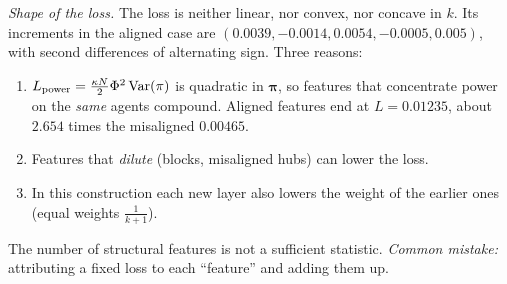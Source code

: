 \documentclass[../solutions_manual.tex]{subfiles}
\begin{document}
\emph{Shape of the loss.} The loss is neither linear, nor convex, nor concave in $k$. Its increments in the aligned case are $(0.0039, -0.0014, 0.0054, -0.0005, 0.005)$, with second differences of alternating sign. Three reasons:
\begin{enumerate}
\item $L_{\text{power}} = \frac{\kappa N}{2}\Phi^2\operatorname{Var}(\pi)$ is quadratic in $\boldsymbol\pi$, so features that concentrate power on the \emph{same} agents compound. Aligned features end at $L = 0.01235$, about $2.654$ times the misaligned $0.00465$.
\item Features that \emph{dilute} (blocks, misaligned hubs) can lower the loss.
\item In this construction each new layer also lowers the weight of the earlier ones (equal weights $\frac1{k+1}$).
\end{enumerate}
The number of structural features is not a sufficient statistic. \emph{Common mistake:} attributing a fixed loss to each ``feature'' and adding them up.
\end{document}
